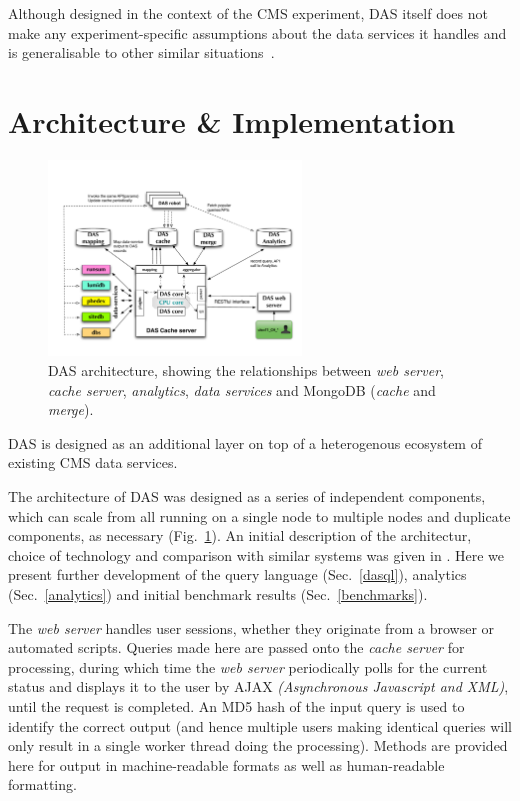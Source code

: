 \documentclass[a4paper]{jpconf}
\begin{document}
Although designed in the context of the CMS experiment, DAS itself does not make any experiment-specific assumptions about the data services it handles and is generalisable to other similar situations~\cite{drsg}.

\section{Architecture \& Implementation}

\begin{figure}
\begin{center}
\includegraphics[width=0.6\textwidth]{DAS_Cache_and_Analytics}
\end{center}
\caption{\label{dasarch}DAS architecture, showing the relationships between \emph{web server}, \emph{cache server}, \emph{analytics}, \emph{data services} and MongoDB (\emph{cache} and \emph{merge}).}
\end{figure}

DAS is designed as an additional layer on top of a heterogenous ecosystem of existing CMS data services.
 
The architecture of DAS was designed as a series of independent components, which can scale from all running on a single node to multiple nodes and duplicate components, as necessary (Fig.~\ref{dasarch}). An initial description of the architectur, choice of technology and comparison with similar systems was given in \cite{das2010}. Here we present further development of the query language (Sec.~\ref{dasql}), analytics (Sec.~\ref{analytics}) and initial benchmark results (Sec.~\ref{benchmarks}).

The \emph{web server} handles user sessions, whether they originate from a browser or automated scripts. Queries made here are passed onto the \emph{cache server} for processing, during which time the \emph{web server} periodically polls for the current status and displays it to the user by AJAX {\it (Asynchronous Javascript and XML)}, until the request is completed. An MD5 hash of the input query is used to identify the correct output (and hence multiple users making identical queries will only result in a single worker thread doing the processing). Methods are provided here for output in machine-readable formats as well as human-readable formatting.
\end{document}
